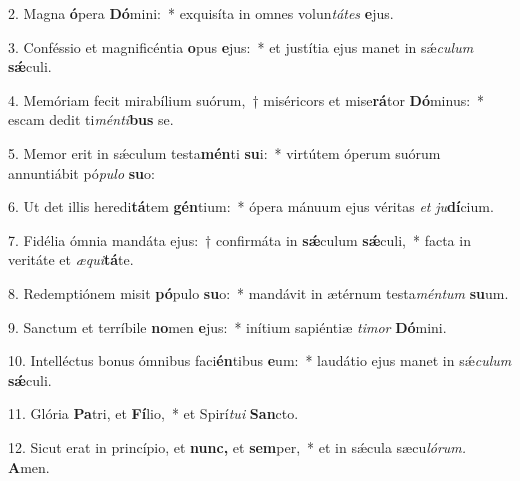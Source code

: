\item 2. Magna \textbf{ó}pera \textbf{Dó}mini:~* exquisíta in omnes volun\textit{tátes} \textbf{e}jus.
\item 3. Conféssio et magnificéntia \textbf{o}pus \textbf{e}jus:~* et justítia ejus manet in sǽ\textit{culum} \textbf{sǽ}culi.
\item 4. Memóriam fecit mirabílium suórum,~† miséricors et mise\textbf{rá}tor \textbf{Dó}minus:~* escam dedit ti\textit{ménti}\textbf{bus} se.
\item 5. Memor erit in sǽculum testa\textbf{mén}ti \textbf{su}i:~* virtútem óperum suórum annuntiábit pó\textit{pulo} \textbf{su}o:
\item 6. Ut det illis heredi\textbf{tá}tem \textbf{gén}tium:~* ópera mánuum ejus véritas \textit{et} \textit{ju}\textbf{dí}cium.
\item 7. Fidélia ómnia mandáta ejus:~† confirmáta in \textbf{sǽ}culum \textbf{sǽ}culi,~* facta in veritáte et \textit{æqui}\textbf{tá}te.
\item 8. Redemptiónem misit \textbf{pó}pulo \textbf{su}o:~* mandávit in ætérnum testa\textit{méntum} \textbf{su}um.
\item 9. Sanctum et terríbile \textbf{no}men \textbf{e}jus:~* inítium sapiéntiæ \textit{timor} \textbf{Dó}mini.
\item 10. Intelléctus bonus ómnibus faci\textbf{én}tibus \textbf{e}um:~* laudátio ejus manet in sǽ\hspace{0.03em}\textit{culum} \textbf{sǽ}culi.
\item 11. Glória \textbf{Pa}tri, et \textbf{Fí}lio,~* et Spirí\textit{tui} \textbf{San}cto.
\item 12. Sicut erat in princípio, et \textbf{nunc,} et \textbf{sem}per,~* et in sǽcula sæcu\hspace{0.03em}\textit{lórum.} \textbf{A}men.
